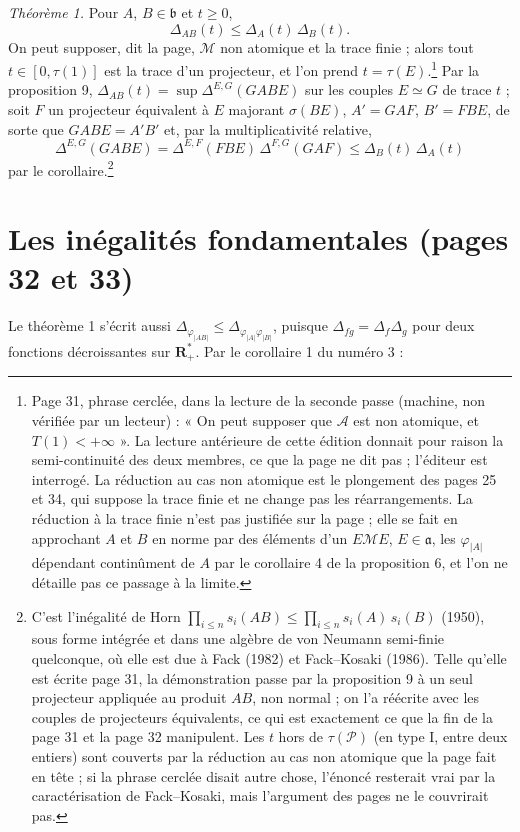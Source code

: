 \documentclass[11pt,a4paper]{article}
\begin{document}
\emph{Théorème 1.} Pour $A$, $B \in \mathfrak{b}$ et $t \geq 0$,
\[
  \Delta_{AB}(t) \leq \Delta_A(t)\,\Delta_B(t) .
\]
On peut supposer, dit la page, $\mathcal{M}$ non atomique et la trace finie ;
alors tout $t \in [0, \tau(1)]$ est la trace d'un projecteur, et l'on prend
$t = \tau(E)$.\footnote{Page 31, phrase cerclée, dans la lecture de la
seconde passe (machine, non vérifiée par un lecteur) : « On peut supposer que
$\mathcal{A}$ est non atomique, et $T(1) < +\infty$ ». La lecture antérieure
de cette édition donnait pour raison la semi-continuité des deux membres, ce
que la page ne dit pas ; l'éditeur est interrogé. La réduction au cas non
atomique est le plongement des pages 25 et 34, qui suppose la trace finie
et ne change pas les réarrangements. La réduction à la trace finie n'est
pas justifiée sur la page ; elle se fait en approchant $A$ et $B$ en norme
par des éléments d'un $E\mathcal{M}E$, $E \in \mathfrak{a}$, les
$\varphi_{|A|}$ dépendant continûment de $A$ par le corollaire 4 de la
proposition 6, et l'on ne détaille pas ce passage à la limite.} Par la
proposition 9,
$\Delta_{AB}(t) = \sup \Delta^{E,G}(GABE)$ sur les couples $E \simeq G$ de
trace $t$ ; soit $F$ un projecteur équivalent à $E$ majorant $\sigma(BE)$,
$A' = GAF$, $B' = FBE$, de sorte que $GABE = A'B'$ et, par la
multiplicativité relative,
\[
  \Delta^{E,G}(GABE) = \Delta^{E,F}(FBE)\,\Delta^{F,G}(GAF)
  \leq \Delta_B(t)\,\Delta_A(t)
\]
par le corollaire.\footnote{C'est l'inégalité de Horn $\prod_{i \leq n}
s_i(AB) \leq \prod_{i \leq n} s_i(A)\,s_i(B)$ (1950), sous forme intégrée et
dans une algèbre de von Neumann semi-finie quelconque, où elle est due à
Fack (1982) et Fack--Kosaki (1986). Telle qu'elle est écrite page 31, la
démonstration passe par la proposition 9 à un seul projecteur appliquée au
produit $AB$, non normal ; on l'a réécrite avec les couples de projecteurs
équivalents, ce qui est exactement ce que la fin de la page 31 et la page 32
manipulent. Les $t$ hors de $\tau(\mathcal{P})$ (en type I, entre deux
entiers) sont couverts par la réduction au cas non atomique que la page
fait en tête ; si la phrase cerclée disait autre chose, l'énoncé resterait
vrai par la caractérisation de Fack--Kosaki, mais l'argument des pages ne le
couvrirait pas.}

\section*{Les inégalités fondamentales (pages 32 et 33)}

Le théorème 1 s'écrit aussi $\Delta_{\varphi_{|AB|}} \leq
\Delta_{\varphi_{|A|}\varphi_{|B|}}$, puisque $\Delta_{fg} = \Delta_f\Delta_g$
pour deux fonctions décroissantes sur $\mathbf{R}^{*}_{+}$. Par le
corollaire 1 du numéro 3 :
\end{document}
